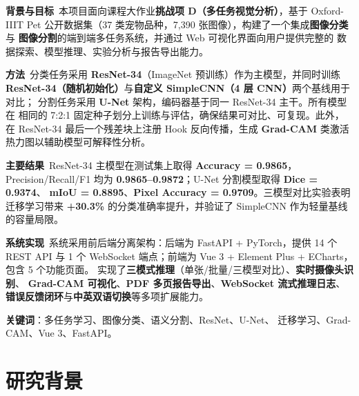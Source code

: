 \documentclass[12pt, a4paper, openany]{ctexbook}
\begin{document}
\begin{abstractbox}
\noindent \textbf{背景与目标}\ 
本项目面向课程大作业\textbf{挑战项 D（多任务视觉分析）}，基于 Oxford-IIIT Pet
公开数据集（37 类宠物品种，7{,}390 张图像），构建了一个集成\textbf{图像分类}与
\textbf{图像分割}的端到端多任务系统，并通过 Web 可视化界面向用户提供完整的
数据探索、模型推理、实验分析与报告导出能力。

\vspace{0.3em}
\noindent \textbf{方法}\ 
分类任务采用 \textbf{ResNet-34}（ImageNet 预训练）作为主模型，并同时训练
\textbf{ResNet-34（随机初始化）}与\textbf{自定义 SimpleCNN（4 层 CNN）}两个基线用于对比；
分割任务采用 \textbf{U-Net} 架构，编码器基于同一 ResNet-34 主干。所有模型在
相同的 7:2:1 固定种子划分上训练与评估，确保结果可对比、可复现。此外，在
ResNet-34 最后一个残差块上注册 Hook 反向传播，生成 \textbf{Grad-CAM}
类激活热力图以辅助模型可解释性分析。

\vspace{0.3em}
\noindent \textbf{主要结果}\ 
ResNet-34 主模型在测试集上取得 \textbf{Accuracy = 0.9865}，Precision/Recall/F1
均为 \textbf{0.9865--0.9872}；U-Net 分割模型取得 \textbf{Dice = 0.9374}、
\textbf{mIoU = 0.8895}、\textbf{Pixel Accuracy = 0.9709}。三模型对比实验表明
迁移学习带来 \textbf{+30.3\%} 的分类准确率提升，并验证了 SimpleCNN
作为轻量基线的容量局限。

\vspace{0.3em}
\noindent \textbf{系统实现}\ 
系统采用前后端分离架构：后端为 FastAPI + PyTorch，提供 14 个 REST API 与 1 个
WebSocket 端点；前端为 Vue 3 + Element Plus + ECharts，包含 5 个功能页面。
实现了\textbf{三模式推理}（单张/批量/三模型对比）、\textbf{实时摄像头识别}、
\textbf{Grad-CAM 可视化}、\textbf{PDF 多页报告导出}、\textbf{WebSocket 流式推理日志}、
\textbf{错误反馈闭环}与\textbf{中英双语切换}等多项扩展能力。

\vspace{0.3em}
\noindent \textbf{关键词}：多任务学习、图像分类、语义分割、ResNet、U-Net、
迁移学习、Grad-CAM、Vue 3、FastAPI。
\end{abstractbox}

\tableofcontents
\thispagestyle{empty}
\clearpage

\setcounter{page}{1}

\chapter{研究背景}
\end{document}
